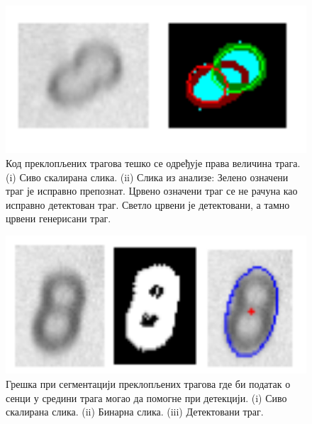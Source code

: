 \documentclass[11pt,a4paper,serbian,oneside]{book}
\begin{document}
\begin{figure}[H]
\begin{center}
\includegraphics[width=150mm]{images/small.png}
\end{center}
\caption{Код преклопљених трагова тешко се одређује права величина трага. (i)  Сиво скалирана слика. (ii) Слика из анализе: Зелено означени траг је исправно препознат. Црвено означени траг се не рачуна као исправно детектован траг. Светло црвени је детектовани, а тамно црвени генерисани траг. }
\label{fig:small}
\end{figure}

\begin{figure}[H]
\begin{center}
\includegraphics[width=150mm]{images/shadow.png}
\end{center}
\caption{Грешка при сегментацији преклопљених трагова где би податак о сенци у средини трага могао да помогне при детекцији. (i) Сиво скалирана слика. (ii) Бинарна слика. (iii) Детектовани траг. }
\label{fig:shadow}
\end{figure}
\end{document}
